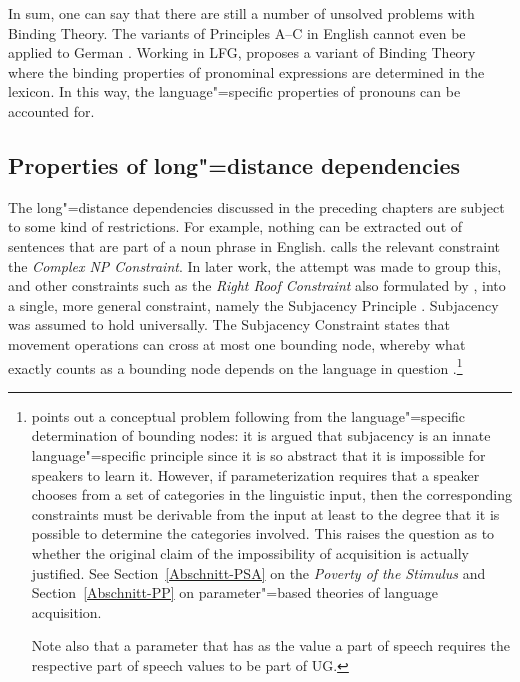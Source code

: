 In sum, one can say that there are still a number of unsolved problems with Binding Theory. The
\hpsg variants of Principles A--C in English cannot
even be applied to German \citep[Chapter~20]{Mueller99a}. Working in LFG, \citet{Dalrymple93a} proposes a variant of Binding Theory where the binding
properties of pronominal expressions are determined in the lexicon. In this way, the language"=specific properties of pronouns can be accounted for.

\subsection{Properties of long"=distance dependencies}
\label{Abschnitt-Fernabhängigkeiten}

The 
long"=distance dependencies discussed in the preceding chapters are subject to some kind of
restrictions. For example, nothing can be extracted out of sentences that are part of a noun phrase
in English. \citet[]{Ross67a} calls the relevant constraint the \emph{Complex NP
  Constraint}. In later work, the attempt was made to group this, and
other constraints such as the \emph{Right Roof Constraint} also formulated
by  \citet[Section~5.1.2]{Ross67a}, into a single, more general constraint, namely the Subjacency
Principle \parencites[]{Chomsky73a}[]{Chomsky86b}{Baltin81a,Baltin2006a}. Subjacency was assumed to hold universally. The Subjacency
Constraint states that movement operations can cross at most one bounding node,
whereby what exactly counts as a bounding node depends on the language in question \parencites[]{Baltin81a}{Baltin2006a}[]{Rizzi82b}[--40]{Chomsky86b}.\footnote{%
	 \citet[--540]{Newmeyer2004a} points out a conceptual problem following from the language"=specific determination of bounding nodes: it is argued
	 that subjacency is an innate language"=specific principle since it is so abstract that it
         is impossible for speakers to learn it. However, if parameterization 
	 requires that a speaker chooses from  a set of categories in the linguistic input, then the corresponding constraints must be derivable from the input at least to
	 the degree that it is possible to determine the categories involved. This raises the question as to whether the original claim of the impossibility of acquisition
	 is actually justified. See Section~\ref{Abschnitt-PSA} on the  \emph{Poverty of the Stimulus}
	 and Section~\ref{Abschnitt-PP} on parameter"=based theories of language
         acquisition.

         Note also that a parameter that has as the value a part of speech requires the respective
         part of speech values to be part of UG.
}

